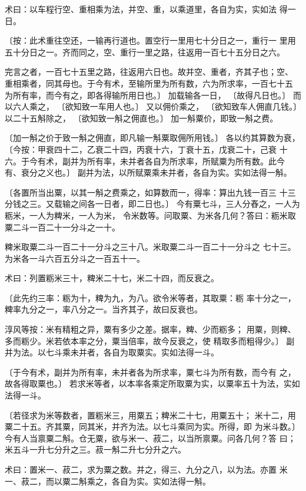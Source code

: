 \documentclass[a4paper,12pt,UTF8,twoside]{ctexbook}
\begin{document}
术曰：以车程行空、重相乘为法，并空、重，以乘道里，各自为实，实如法 得一日。

〔按：此术重往空还，一输再行道也。置空行一里用七十分日之一，重行一 里用五十分日之一。齐而同之，空、重行一里之路，往返用一百七十五分日之六。

完言之者，一百七十五里之路，往返用六日也。故并空、重者，齐其子也；空、 重相乘者，同其母也。于今有术，至输所里为所有数，六为所求率，一百七十五 为所有率，而今有之，即各得输所用日也。〕 加载输各一日， 〔故得凡日也。〕 而以六人乘之， 〔欲知致一车用人也。〕 又以佣价乘之， 〔欲知致车人佣直几钱。〕 以二十五斛除之， 〔欲知致一斛之佣直也。〕 加一斛粟价，即致一斛之费。

〔加一斛之价于致一斛之佣直，即凡输一斛粟取佣所用钱。〕 各以约其算数为衰， 〔今按：甲衰四十二，乙衰二十四，丙衰十六，丁衰十五，戊衰二十，己衰 十六。于今有术，副并为所有率，未并者各自为所求率，所赋粟为所有数。此今 有、衰分之义也。〕 副并为法，以所赋粟乘未并者，各自为实。实如法得一斛。

〔各置所当出粟，以其一斛之费乘之，如算数而一，得率：算出九钱一百三 十三分钱之三。又载输之间各一日者，即二日也。〕 今有粟七斗，三人分舂之，一人为粝米，一人为粺米，一人为米， 令米数等。问取粟、为米各几何？答曰：粝米取粟二斗一百二十一分斗之一十。

粺米取粟二斗一百二十一分斗之三十八。米取粟二斗一百二十一分斗之 七十三。为米各一斗六百五分斗之一百五十一。

术曰：列置粝米三十，粺米二十七，米二十四，而反衰之。

〔此先约三率：粝为十，粺为九，为八。欲令米等者，其取粟：粝 率十分之一，粺率九分之一，率八分之一。当齐其子，故曰反衰也。

淳风等按：米有精粗之异，粟有多少之差。据率，粺、少而粝多； 用粟，则粺、多而粝少。米若依本率之分，粟当倍率，故今反衰之，使 精取多而粗得少。〕 副并为法。以七斗乘未并者，各自为取粟实。实如法得一斗。

〔于今有术，副并为所有率，未并者各为所求率，粟七斗为所有数，而今有 之，故各得取粟也。〕 若求米等者，以本率各乘定所取粟为实，以粟率五十为法，实如法得一斗。

〔若径求为米等数者，置粝米三，用粟五；粺米二十七，用粟五十； 米十二，用粟二十五。齐其粟，同其米，并齐为法。以七斗乘同为实。所得，即 为米斗数。〕 今有人当禀粟二斛。仓无粟，欲与米一、菽二，以当所禀粟。问各几何？答 曰；米五斗一升七分升之三。菽一斛二升七分升之六。

术曰：置米一、菽二，求为粟之数。并之，得三、九分之八，以为法。亦置 米一、菽二，而以粟二斛乘之，各自为实。实如法得一斛。
\end{document}
